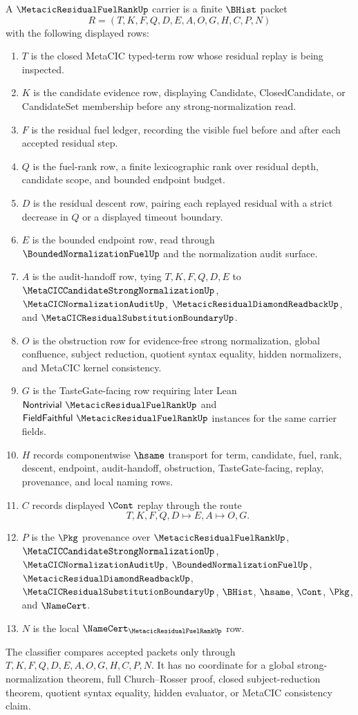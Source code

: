 \begin{definition}
\label{def:metacic-residual-fuel-rank-carrier}
A $\MetacicResidualFuelRankUp$ carrier is a finite $\BHist$ packet
$$
R=(T,K,F,Q,D,E,A,O,G,H,C,P,N)
$$
with the following displayed rows:
\begin{enumerate}
\item $T$ is the closed MetaCIC typed-term row whose residual replay is being inspected.
\item $K$ is the candidate evidence row, displaying Candidate, ClosedCandidate, or CandidateSet membership before any strong-normalization read.
\item $F$ is the residual fuel ledger, recording the visible fuel before and after each accepted residual step.
\item $Q$ is the fuel-rank row, a finite lexicographic rank over residual depth, candidate scope, and bounded endpoint budget.
\item $D$ is the residual descent row, pairing each replayed residual with a strict decrease in $Q$ or a displayed timeout boundary.
\item $E$ is the bounded endpoint row, read through $\BoundedNormalizationFuelUp$ and the normalization audit surface.
\item $A$ is the audit-handoff row, tying $T,K,F,Q,D,E$ to $\MetaCICCandidateStrongNormalizationUp$, $\MetaCICNormalizationAuditUp$, $\MetacicResidualDiamondReadbackUp$, and $\MetaCICResidualSubstitutionBoundaryUp$.
\item $O$ is the obstruction row for evidence-free strong normalization, global confluence, subject reduction, quotient syntax equality, hidden normalizers, and MetaCIC kernel consistency.
\item $G$ is the TasteGate-facing row requiring later Lean $\mathsf{Nontrivial}\ \MetacicResidualFuelRankUp$ and $\mathsf{FieldFaithful}\ \MetacicResidualFuelRankUp$ instances for the same carrier fields.
\item $H$ records componentwise $\hsame$ transport for term, candidate, fuel, rank, descent, endpoint, audit-handoff, obstruction, TasteGate-facing, replay, provenance, and local naming rows.
\item $C$ records displayed $\Cont$ replay through the route
$$
T,K,F,Q,D \longmapsto E,A \longmapsto O,G .
$$
\item $P$ is the $\Pkg$ provenance over $\MetacicResidualFuelRankUp$, $\MetaCICCandidateStrongNormalizationUp$, $\MetaCICNormalizationAuditUp$, $\BoundedNormalizationFuelUp$, $\MetacicResidualDiamondReadbackUp$, $\MetaCICResidualSubstitutionBoundaryUp$, $\BHist$, $\hsame$, $\Cont$, $\Pkg$, and $\NameCert$.
\item $N$ is the local $\NameCert_{\MetacicResidualFuelRankUp}$ row.
\end{enumerate}
The classifier compares accepted packets only through $T,K,F,Q,D,E,A,O,G,H,C,P,N$. It has no coordinate for a global strong-normalization theorem, full Church--Rosser proof, closed subject-reduction theorem, quotient syntax equality, hidden evaluator, or MetaCIC consistency claim.
\end{definition}

